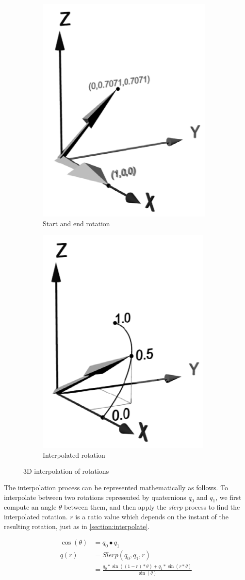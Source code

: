 \begin{figure}[h!]
\centering
\begin{subfigure}{.5\textwidth}
  \centering
  \includegraphics[width=.4\linewidth]{images/3d_start_end_rotations.png}
  \caption{Start and end rotation}
\end{subfigure}%
\begin{subfigure}{.5\textwidth}
  \centering
  \includegraphics[width=.4\linewidth]{images/3d_interpolated_rotation.png}
  \caption{Interpolated rotation}
\end{subfigure}
\caption{3D interpolation of rotations \cite{ISO19141_moving_features}}
\label{fig:3d_interpolation}
\end{figure}

The interpolation process can be represented mathematically as follows. To interpolate between two rotations represented by quaternions \( q_0 \) and \( q_1 \), we first compute an angle \( \theta \) between them, and then apply the \textit{slerp} process to find the interpolated rotation. $r$ is a ratio value which depends on the instant of the resulting rotation, just as in \ref{section:interpolate}.

\begin{equation}
\begin{split}
    \cos(\theta)    & = q_0 \bullet q_1 \\
    q(r)            & = Slerp(q_0, q_1, r) \\
                    & = \frac{q_0 * \sin((1-r)*\theta) + q_1 * \sin(r*\theta)}{\sin(\theta)}
\end{split}
\end{equation}
    

